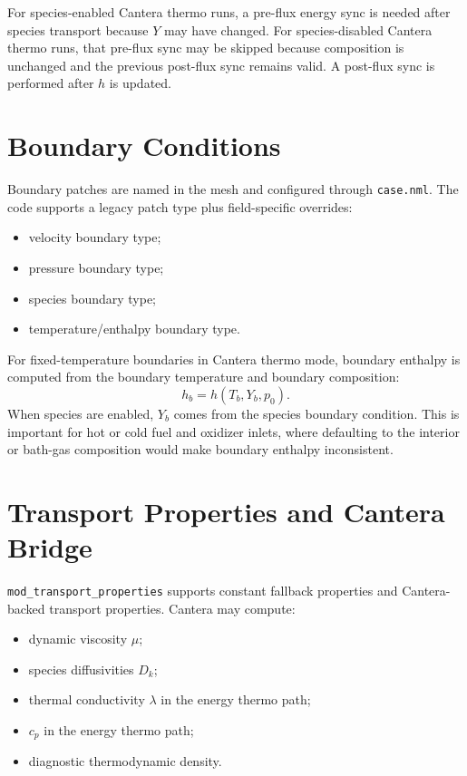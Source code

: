 \documentclass[11pt]{article}
\begin{document}
For species-enabled Cantera thermo runs, a pre-flux energy sync is needed after
species transport because \(Y\) may have changed.  For species-disabled Cantera
thermo runs, that pre-flux sync may be skipped because composition is unchanged
and the previous post-flux sync remains valid.  A post-flux sync is performed
after \(h\) is updated.

\section{Boundary Conditions}

Boundary patches are named in the mesh and configured through \texttt{case.nml}.
The code supports a legacy patch type plus field-specific overrides:
\begin{itemize}[leftmargin=*]
  \item velocity boundary type;
  \item pressure boundary type;
  \item species boundary type;
  \item temperature/enthalpy boundary type.
\end{itemize}

For fixed-temperature boundaries in Cantera thermo mode, boundary enthalpy is
computed from the boundary temperature and boundary composition:
\begin{equation}
  h_b = h(T_b,Y_b,p_0).
\end{equation}
When species are enabled, \(Y_b\) comes from the species boundary condition.
This is important for hot or cold fuel and oxidizer inlets, where defaulting to
the interior or bath-gas composition would make boundary enthalpy inconsistent.

\section{Transport Properties and Cantera Bridge}

\texttt{mod\_transport\_properties} supports constant fallback properties and
Cantera-backed transport properties.  Cantera may compute:
\begin{itemize}[leftmargin=*]
  \item dynamic viscosity \(\mu\);
  \item species diffusivities \(D_k\);
  \item thermal conductivity \(\lambda\) in the energy thermo path;
  \item \(c_p\) in the energy thermo path;
  \item diagnostic thermodynamic density.
\end{itemize}
\end{document}
